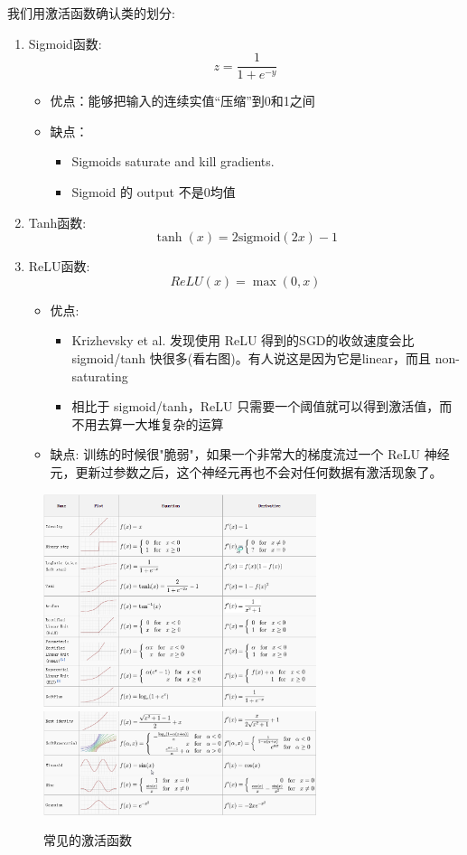 \documentclass[11pt]{article}
\begin{document}
			我们用激活函数确认类的划分:
			\begin{enumerate}
				\item Sigmoid函数:\[z = \frac{1}{1 + e^{-y}}\] \begin{itemize}
								\item 优点：能够把输入的连续实值“压缩”到0和1之间
								\item 缺点： \begin{itemize}
												\item Sigmoids saturate and kill gradients.
												\item Sigmoid 的 output 不是0均值
											\end{itemize}
										\end{itemize}
				\item Tanh函数:\[\tanh(x) = 2\mathrm{sigmoid}(2x)-1\]
				\item ReLU函数:\[ReLU(x) = \max(0, x)\] \begin{itemize}
					\item 优点: \begin{itemize}
									\item Krizhevsky et al. 发现使用 ReLU 得到的SGD的收敛速度会比 sigmoid/tanh 快很多(看右图)。有人说这是因为它是linear，而且 non-saturating
									\item 相比于 sigmoid/tanh，ReLU 只需要一个阈值就可以得到激活值，而不用去算一大堆复杂的运算
								\end{itemize}
					\item 缺点: 训练的时候很"脆弱"，如果一个非常大的梯度流过一个 ReLU 神经元，更新过参数之后，这个神经元再也不会对任何数据有激活现象了。
							\end{itemize}
			\end{enumerate}
			\begin{figure}[H]
        		\begin{center}
        			\includegraphics[width=8cm]{./imgs/ac1.png}
        			\includegraphics[width=8cm]{./imgs/ac2.png}
        			\caption{常见的激活函数}
        		\end{center}
    		\end{figure}
    		
\end{document}
